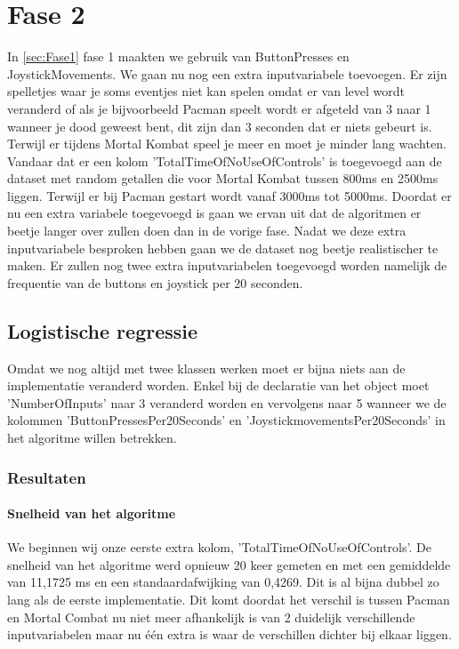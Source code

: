 
\newpage
\section{Fase 2}
\label{sec:Fase2}

In \ref{sec:Fase1} fase 1 maakten we gebruik van ButtonPresses en JoystickMovements. We gaan nu nog een extra inputvariabele toevoegen. Er zijn spelletjes waar je soms eventjes niet kan spelen omdat er van level wordt veranderd of als je bijvoorbeeld Pacman speelt wordt er afgeteld van 3 naar 1 wanneer je dood geweest bent, dit zijn dan 3 seconden dat er niets gebeurt is. Terwijl er tijdens Mortal Kombat speel je meer en moet je minder lang wachten.
Vandaar dat er een kolom 'TotalTimeOfNoUseOfControls' is toegevoegd aan de dataset met random getallen die voor Mortal Kombat tussen 800ms en 2500ms liggen. Terwijl er bij Pacman gestart wordt vanaf 3000ms tot 5000ms.
Doordat er nu een extra variabele toegevoegd is gaan we ervan uit dat de algoritmen er beetje langer over zullen doen dan in de vorige fase. Nadat we deze extra inputvariabele besproken hebben gaan we de dataset nog beetje realistischer te maken. Er zullen nog twee extra inputvariabelen toegevoegd worden namelijk de frequentie van de buttons en joystick per 20 seconden.  

\subsection{Logistische regressie}
\label{sec:Logistischeregressie-fase2}

Omdat we nog altijd met twee klassen werken moet er bijna niets aan de implementatie veranderd worden. Enkel bij de declaratie van het object moet 'NumberOfInputs' naar 3 veranderd worden en vervolgens naar 5 wanneer we de kolommen 'ButtonPressesPer20Seconds' en 'JoystickmovementsPer20Seconds' in het algoritme willen betrekken. 

\subsubsection{Resultaten}
\paragraph{Snelheid van het algoritme} 
We beginnen wij onze eerste extra kolom, 'TotalTimeOfNoUseOfControls'. De snelheid van het algoritme werd opnieuw 20 keer gemeten en met een gemiddelde van 11,1725 ms en een standaardafwijking van 0,4269. Dit is al bijna dubbel zo lang als de eerste implementatie. Dit komt doordat het verschil is tussen Pacman en Mortal Combat nu niet meer afhankelijk is van 2 duidelijk verschillende inputvariabelen maar nu één extra is waar de verschillen dichter bij elkaar liggen.

